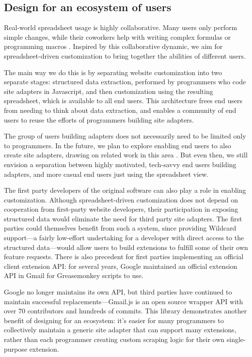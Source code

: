 \documentclass[english,submission]{programming}
\begin{document}
\hypertarget{design-for-an-ecosystem-of-users}{%
\subsection{Design for an ecosystem of
users}\label{design-for-an-ecosystem-of-users}}

Real-world spreadsheet usage is highly collaborative. Many users only
perform simple changes, while their coworkers help with writing complex
formulas or programming macros \autocite{nardi1990}. Inspired by this
collaborative dynamic, we aim for spreadsheet-driven customization to
bring together the abilities of different users.

The main way we do this is by separating website customization into two
separate stages: structured data extraction, performed by programmers
who code site adapters in Javascript, and then customization using the
resulting spreadsheet, which is available to all end users. This
architecture frees end users from needing to think about data
extraction, and enables a community of end users to reuse the efforts of
programmers building site adapters.

The group of users building adapters does not necessarily need to be
limited only to programmers. In the future, we plan to explore enabling
end users to also create site adapters, drawing on related work in this
area \autocite{chasins2018,huynh2006}. But even then, we still envision
a separation between highly motivated, tech-savvy end users building
adapters, and more casual end users just using the spreadsheet view.

The first party developers of the original software can also play a role
in enabling customization. Although spreadsheet-driven customization
does not depend on cooperation from first-party website developers,
their participation in exposing structured data would eliminate the need
for third party site adapters. The first parties could themselves
benefit from such a system, since providing Wildcard support---a fairly
low-effort undertaking for a developer with direct access to the
structured data---would allow users to build extensions to fulfill some
of their own feature requests. There is also precedent for first parties
implementing an official client extension API: for several years, Google
maintained an official extension API in Gmail for Greasemonkey scripts
to use.

Google no longer maintains its own API, but third parties have continued
to maintain successful replacements---Gmail.js \autocite{talwar2019} is
an open source wrapper API with over 70 contributors and hundreds of
commits. This library demonstrates another benefit of designing for an
ecosystem: it's easier for many programmers to collectively maintain a
generic site adapter that can support many extensions, rather than each
programmer creating custom scraping logic for their own single-purpose
extension.
\end{document}
